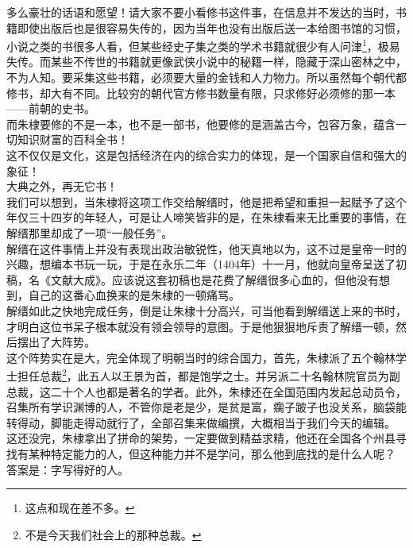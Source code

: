 \begin{multicols}{\theparacolNo}
多么豪壮的话语和愿望！请大家不要小看修书这件事，在信息并不发达的当时，书籍即使出版后也是很容易失传的，因为当年也没有出版后送一本给图书馆的习惯，小说之类的书很多人看，但某些经史子集之类的学术书籍就很少有人问津\footnote{这点和现在差不多。}，极易失传。而某些不传世的书籍就更像武侠小说中的秘籍一样，隐藏于深山密林之中，不为人知。要采集这些书籍，必须要大量的金钱和人力物力。所以虽然每个朝代都修书，却大有不同。比较穷的朝代官方修书数量有限，只求修好必须修的那一本——前朝的史书。\\

而朱棣要修的不是一本，也不是一部书，他要修的是涵盖古今，包容万象，蕴含一切知识财富的百科全书！\\

这不仅仅是文化，这是包括经济在内的综合实力的体现，是一个国家自信和强大的象征！\\

大典之外，再无它书！\\

我们可以想到，当朱棣将这项工作交给解缙时，他是把希望和重担一起赋予了这个年仅三十四岁的年轻人，可是让人啼笑皆非的是，在朱棣看来无比重要的事情，在解缙那里却成了一项“一般任务”。\\

解缙在这件事情上并没有表现出政治敏锐性，他天真地以为，这不过是皇帝一时的兴趣，想编本书玩一玩，于是在永乐二年（1404年）十一月，他就向皇帝呈送了初稿，名《文献大成》。应该说这套初稿也是花费了解缙很多心血的，但他没有想到，自己的这番心血换来的是朱棣的一顿痛骂。\\

解缙如此之快地完成任务，倒是让朱棣十分高兴，可当他看到解缙送上来的书时，才明白这位书呆子根本就没有领会领导的意图。于是他狠狠地斥责了解缙一顿，然后摆出了大阵势。\\

这个阵势实在是大，完全体现了明朝当时的综合国力，首先，朱棣派了五个翰林学士担任总裁\footnote{不是今天我们社会上的那种总裁。}，此五人以王景为首，都是饱学之士。并另派二十名翰林院官员为副总裁，这二十个人也都是著名的学者。此外，朱棣还在全国范围内发起总动员令，召集所有学识渊博的人，不管你是老是少，是贫是富，瘸子跛子也没关系，脑袋能转得动，脚能走得动就行了，全部召集来做编撰，大概相当于我们今天的编辑。\\

这还没完，朱棣拿出了拼命的架势，一定要做到精益求精，他还在全国各个州县寻找有某种特定能力的人，但这种能力并不是学问，那么他到底找的是什么人呢？\\

答案是：字写得好的人。\\


\end{multicols}
